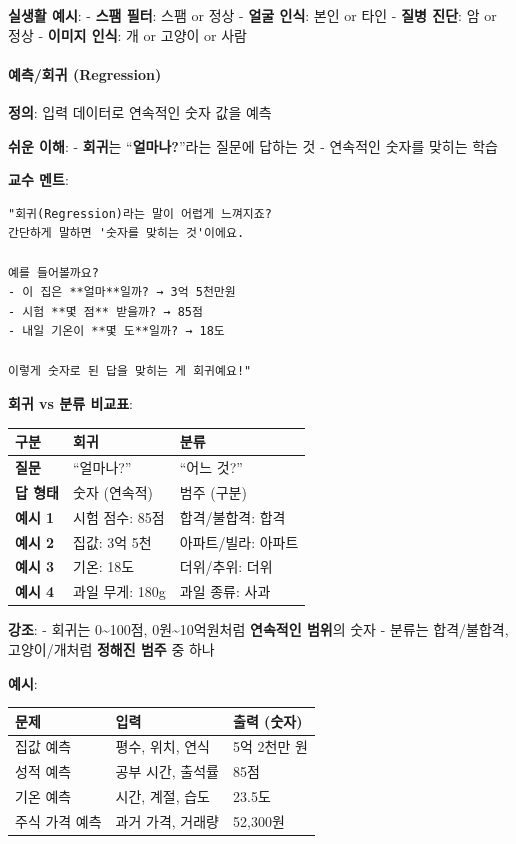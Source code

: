 \documentclass[a4paper, 11pt]{article}
\begin{document}
\textbf{실생활 예시}: - \textbf{스팸 필터}: 스팸 or 정상 - \textbf{얼굴
인식}: 본인 or 타인 - \textbf{질병 진단}: 암 or 정상 - \textbf{이미지
인식}: 개 or 고양이 or 사람

\hypertarget{uxc608uxce21uxd68cuxadc0-regression}{%
\paragraph{ 예측/회귀
(Regression)}\label{uxc608uxce21uxd68cuxadc0-regression}}

\textbf{정의}: 입력 데이터로 연속적인 숫자 값을 예측

 \textbf{쉬운 이해}: - \textbf{회귀}는 ``\textbf{얼마나?}''라는 질문에
답하는 것 - 연속적인 숫자를 맞히는 학습

\textbf{교수 멘트}:

\begin{verbatim}
"회귀(Regression)라는 말이 어렵게 느껴지죠?
간단하게 말하면 '숫자를 맞히는 것'이에요.

예를 들어볼까요?
- 이 집은 **얼마**일까? → 3억 5천만원
- 시험 **몇 점** 받을까? → 85점
- 내일 기온이 **몇 도**일까? → 18도

이렇게 숫자로 된 답을 맞히는 게 회귀예요!"
\end{verbatim}

\textbf{회귀 vs 분류 비교표}:

\begin{longtable}{p{2cm}p{4cm}p{8cm}}
\toprule\noalign{}
구분 & 회귀 & 분류 \\
\midrule\noalign{}
\endhead
\bottomrule\noalign{}
\endlastfoot
\textbf{질문} & ``얼마나?'' & ``어느 것?'' \\
\textbf{답 형태} & 숫자 (연속적) & 범주 (구분) \\
\textbf{예시 1} & 시험 점수: 85점 & 합격/불합격: 합격 \\
\textbf{예시 2} & 집값: 3억 5천 & 아파트/빌라: 아파트 \\
\textbf{예시 3} & 기온: 18도 & 더위/추위: 더위 \\
\textbf{예시 4} & 과일 무게: 180g & 과일 종류: 사과 \\
\end{longtable}

\textbf{강조}: - 회귀는 0\textasciitilde100점,
0원\textasciitilde10억원처럼 \textbf{연속적인 범위}의 숫자 - 분류는
합격/불합격, 고양이/개처럼 \textbf{정해진 범주} 중 하나

\textbf{예시}:

\begin{longtable}{p{3cm}p{4cm}p{7cm}}
\toprule\noalign{}
문제 & 입력 & 출력 (숫자) \\
\midrule\noalign{}
\endhead
\bottomrule\noalign{}
\endlastfoot
집값 예측 & 평수, 위치, 연식 & 5억 2천만 원 \\
성적 예측 & 공부 시간, 출석률 & 85점 \\
기온 예측 & 시간, 계절, 습도 & 23.5도 \\
주식 가격 예측 & 과거 가격, 거래량 & 52,300원 \\
\end{longtable}
\end{document}

